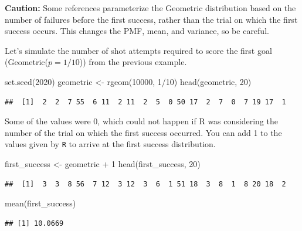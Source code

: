 \documentclass[
  11pt,
]{book}
\newenvironment{Shaded}{\begin{snugshade}}{\end{snugshade}}
\newcommand{\DecValTok}[1]{\textcolor[rgb]{0.00,0.00,0.81}{#1}}
\newcommand{\FunctionTok}[1]{\textcolor[rgb]{0.00,0.00,0.00}{#1}}
\newcommand{\NormalTok}[1]{#1}
\newcommand{\OtherTok}[1]{\textcolor[rgb]{0.56,0.35,0.01}{#1}}
\newcommand{\SpecialCharTok}[1]{\textcolor[rgb]{0.00,0.00,0.00}{#1}}
\theoremstyle{definition}
\theoremstyle{definition}
\theoremstyle{definition}
\theoremstyle{definition}
\theoremstyle{remark}
\begin{document}
\textbf{Caution:} Some references parameterize the Geometric distribution based on the number of failures before the first success, rather than the trial on which the first success occurs. This changes the PMF, mean, and variance, so be careful.

Let's simulate the number of shot attempts required to score the first goal (Geometric(\(p=1/10\))) from the previous example.

\begin{Shaded}
\begin{Highlighting}[]
\FunctionTok{set.seed}\NormalTok{(}\DecValTok{2020}\NormalTok{)}
\NormalTok{geometric }\OtherTok{\textless{}{-}} \FunctionTok{rgeom}\NormalTok{(}\DecValTok{10000}\NormalTok{, }\DecValTok{1}\SpecialCharTok{/}\DecValTok{10}\NormalTok{)}
\FunctionTok{head}\NormalTok{(geometric, }\DecValTok{20}\NormalTok{)}
\end{Highlighting}
\end{Shaded}

\begin{verbatim}
##  [1]  2  2  7 55  6 11  2 11  2  5  0 50 17  2  7  0  7 19 17  1
\end{verbatim}

Some of the values were 0, which could not happen if R was considering the number of the trial on which the first success occurred. You can add 1 to the values given by \texttt{R} to arrive at the first success distribution.

\begin{Shaded}
\begin{Highlighting}[]
\NormalTok{first\_success }\OtherTok{\textless{}{-}}\NormalTok{ geometric }\SpecialCharTok{+} \DecValTok{1}
\FunctionTok{head}\NormalTok{(first\_success, }\DecValTok{20}\NormalTok{)}
\end{Highlighting}
\end{Shaded}

\begin{verbatim}
##  [1]  3  3  8 56  7 12  3 12  3  6  1 51 18  3  8  1  8 20 18  2
\end{verbatim}

\begin{Shaded}
\begin{Highlighting}[]
\FunctionTok{mean}\NormalTok{(first\_success)}
\end{Highlighting}
\end{Shaded}

\begin{verbatim}
## [1] 10.0669
\end{verbatim}
\end{document}
